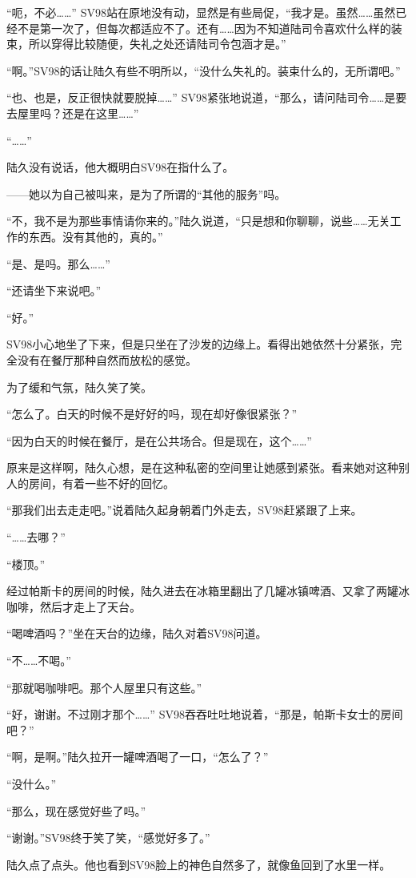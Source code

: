 “呃，不必……” SV98站在原地没有动，显然是有些局促，“我才是。虽然……虽然已经不是第一次了，但每次都适应不了。还有……因为不知道陆司令喜欢什么样的装束，所以穿得比较随便，失礼之处还请陆司令包涵才是。”

“啊。”SV98的话让陆久有些不明所以，“没什么失礼的。装束什么的，无所谓吧。”

“也、也是，反正很快就要脱掉……” SV98紧张地说道，“那么，请问陆司令……是要去屋里吗？还是在这里……”

“……”

陆久没有说话，他大概明白SV98在指什么了。

——她以为自己被叫来，是为了所谓的“其他的服务”吗。

“不，我不是为那些事情请你来的。”陆久说道，“只是想和你聊聊，说些……无关工作的东西。没有其他的，真的。”

“是、是吗。那么……”

“还请坐下来说吧。”

“好。”

SV98小心地坐了下来，但是只坐在了沙发的边缘上。看得出她依然十分紧张，完全没有在餐厅那种自然而放松的感觉。

为了缓和气氛，陆久笑了笑。

“怎么了。白天的时候不是好好的吗，现在却好像很紧张？”

“因为白天的时候在餐厅，是在公共场合。但是现在，这个……”

原来是这样啊，陆久心想，是在这种私密的空间里让她感到紧张。看来她对这种别人的房间，有着一些不好的回忆。

“那我们出去走走吧。”说着陆久起身朝着门外走去，SV98赶紧跟了上来。

“……去哪？”

“楼顶。”

经过帕斯卡的房间的时候，陆久进去在冰箱里翻出了几罐冰镇啤酒、又拿了两罐冰咖啡，然后才走上了天台。

“喝啤酒吗？”坐在天台的边缘，陆久对着SV98问道。

“不……不喝。”

“那就喝咖啡吧。那个人屋里只有这些。”

“好，谢谢。不过刚才那个……” SV98吞吞吐吐地说着，“那是，帕斯卡女士的房间吧？”

“啊，是啊。”陆久拉开一罐啤酒喝了一口，“怎么了？”

“没什么。”

“那么，现在感觉好些了吗。”

“谢谢。”SV98终于笑了笑，“感觉好多了。”

陆久点了点头。他也看到SV98脸上的神色自然多了，就像鱼回到了水里一样。

